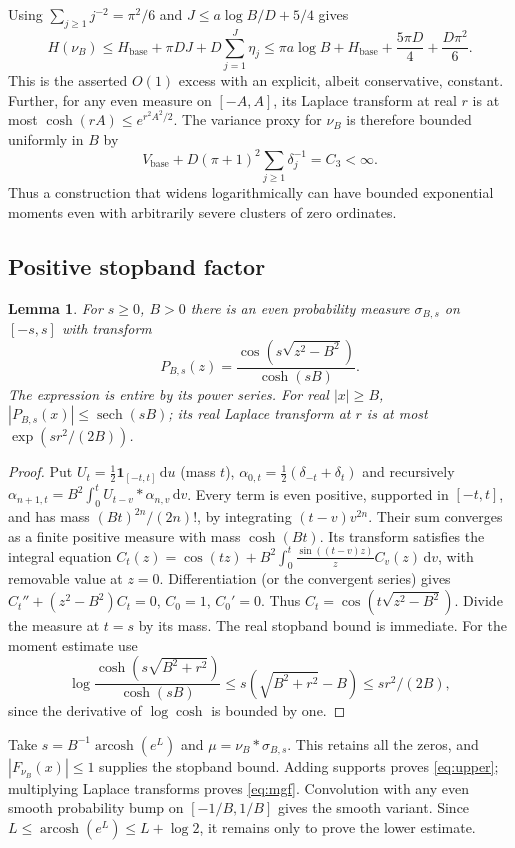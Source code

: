 \documentclass[11pt,letterpaper]{article}
\newtheorem{lemma}[theorem]{Lemma}
\theoremstyle{remark}\newtheorem{remark}[theorem]{Remark}
\newcommand{\dd}{\,\mathrm d}\newcommand{\sinc}{\operatorname{sinc}}
\newcommand{\arcosh}{\operatorname{arcosh}}\newcommand{\sech}{\operatorname{sech}}
\begin{document}
Using $\sum_{j\ge1}j^{-2}=\pi^2/6$ and $J\le a\log B/D+5/4$ gives
\begin{equation}\label{eq:cancelbound}
 H(\nu_B)\le H_\mathrm{base}+\pi D J+D\sum_{j=1}^J\eta_j
 \le \pi a\log B+H_\mathrm{base}+\frac{5\pi D}{4}+\frac{D\pi^2}{6}.
\end{equation}
This is the asserted $O(1)$ excess with an explicit, albeit conservative, constant. Further, for any even measure on $[-A,A]$, its Laplace transform at real $r$ is at most $\cosh(rA)\le e^{r^2A^2/2}$. The variance proxy for $\nu_B$ is therefore bounded uniformly in $B$ by
\begin{equation}\label{eq:variance}
 V_\mathrm{base}+D(\pi+1)^2\sum_{j\ge1}\delta_j^{-1}=C_3<\infty.
\end{equation}
Thus a construction that widens logarithmically can have bounded exponential moments even with arbitrarily severe clusters of zero ordinates.

\subsection{Positive stopband factor}
\begin{lemma}\label{lem:cheb}
For $s\ge0$, $B>0$ there is an even probability measure $\sigma_{B,s}$ on $[-s,s]$ with transform
\[
 P_{B,s}(z)=\frac{\cos(s\sqrt{z^2-B^2})}{\cosh(sB)}.
\]
The expression is entire by its power series. For real $|x|\ge B$, $|P_{B,s}(x)|\le\sech(sB)$; its real Laplace transform at $r$ is at most $\exp(sr^2/(2B))$.
\end{lemma}
\begin{proof}
Put $U_t=\tfrac12\mathbf1_{[-t,t]}\dd u$ (mass $t$), $\alpha_{0,t}=\tfrac12(\delta_{-t}+\delta_t)$ and recursively $\alpha_{n+1,t}=B^2\int_0^t U_{t-v}*\alpha_{n,v}\dd v$. Every term is even positive, supported in $[-t,t]$, and has mass $(Bt)^{2n}/(2n)!$, by integrating $(t-v)v^{2n}$. Their sum converges as a finite positive measure with mass $\cosh(Bt)$. Its transform satisfies the integral equation
$C_t(z)=\cos(tz)+B^2\int_0^t\frac{\sin((t-v)z)}z C_v(z)\dd v$, with removable value at $z=0$. Differentiation (or the convergent series) gives $C_t''+(z^2-B^2)C_t=0$, $C_0=1$, $C_0'=0$. Thus $C_t=\cos(t\sqrt{z^2-B^2})$. Divide the measure at $t=s$ by its mass. The real stopband bound is immediate. For the moment estimate use
\[
 \log\frac{\cosh(s\sqrt{B^2+r^2})}{\cosh(sB)}
 \le s(\sqrt{B^2+r^2}-B)\le sr^2/(2B),
\]
since the derivative of $\log\cosh$ is bounded by one.
\end{proof}
Take $s=B^{-1}\arcosh(e^L)$ and $\mu=\nu_B*\sigma_{B,s}$. This retains all the zeros, and $|F_{\nu_B}(x)|\le1$ supplies the stopband bound. Adding supports proves \eqref{eq:upper}; multiplying Laplace transforms proves \eqref{eq:mgf}. Convolution with any even smooth probability bump on $[-1/B,1/B]$ gives the smooth variant. Since $L\le\arcosh(e^L)\le L+\log2$, it remains only to prove the lower estimate.
\end{document}
